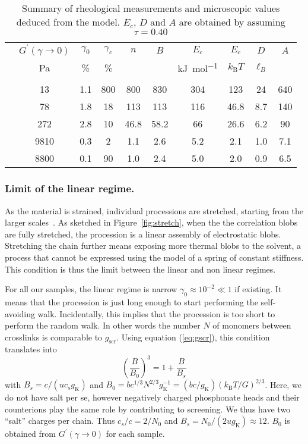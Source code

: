 \documentclass[twoside,twocolumn,9pt]{article}
\begin{document}
\begin{table*}
\centering
\begin{tabular}{@{}lSSSSSSSSS@{}}\hline
& {$G^\prime(\gamma\rightarrow 0)$} & {$\gamma_0$} & {$\gamma_c$} & {$n$} & {$B$} & {$E_c$} & {$E_c$} & {$D$} & {$A$}\\
&	{\si{\pascal}} & {\%} & {\%} & & & {\si{\kilo\joule\per\mole}}& {$k_\mathrm{B}T$} & {$\ell_B$}&\\\hline&&&&&\\[-10pt]
	&	13	&	1.1	&	800	&	800	&	830	&	304	&	123	&	24	&	640\\
	&	78	&	1.8	&	18	&	113	&	113	&	116	&	46.8	&	8.7	&	140\\
	&	272	&	2.8	&	10	&	46.8	&	58.2	&	66	&	26.6	&	6.2	&	90\\
	&	9810	&	0.3	&	2	&	1.1	&	2.6	&	5.2	&	2.1	&	1.0	&	7.1\\
	&	8800	&	0.1	&	90	&	1.0	&	2.4	&	5.0	&	2.0	&	0.9	&	6.5\\
\hline
\end{tabular}
\caption{Summary of rheological measurements and microscopic values deduced from the model. $E_c$, $D$ and $A$ are obtained by assuming $\tau=0.40$}
\label{tab:results}
\end{table*}

\subsubsection{Limit of the linear regime.}

As the material is strained, individual processions are stretched, starting from the larger scales~\cite{Pincus1976}. As sketched in Figure~\ref{fig:stretch}, when the the correlation blobs are fully stretched, the procession is a linear assembly of electrostatic blobs. Stretching the chain further means exposing more thermal blobs to the solvent, a process that cannot be expressed using the model of a spring of constant stiffness. This condition is thus the limit between the linear and non linear regimes.

For all our samples, the linear regime is narrow $\gamma_0\approx 10^{-2}\ll 1$ if existing. It means that the procession is just long enough to start performing the self-avoiding walk. Incidentally, this implies that the procession is too short to perform the random walk. In other words the number $N$ of monomers between crosslinks is comparable to $g_\mathrm{scr}$. Using equation (\ref{eq:gscr}), this condition translates into
\begin{equation}
\left(\frac{B}{B_0}\right)^3 = 1 + \frac{B}{B_s}
\label{eq:solveB}
\end{equation}
with $B_s = c/(u c_s g_\mathrm{K})$ and $B_0 = b c^{1/3} N^{2/3} g_\mathrm{K}^{-1} = (bc/g_\mathrm{K}) \left(k_\mathrm{B}T/G\right)^{2/3}$. Here, we do not have salt per se, however negatively charged phosphonate heads and their counterions play the same role by contributing to screening. We thus have two ``salt'' charges per chain. Thus $c_s/c = 2/N_0$ and $B_s = N_0/(2u g_\mathrm{K}) \approx 12$. $B_0$ is obtained from $G^\prime(\gamma\rightarrow 0)$ for each sample.
\end{document}
